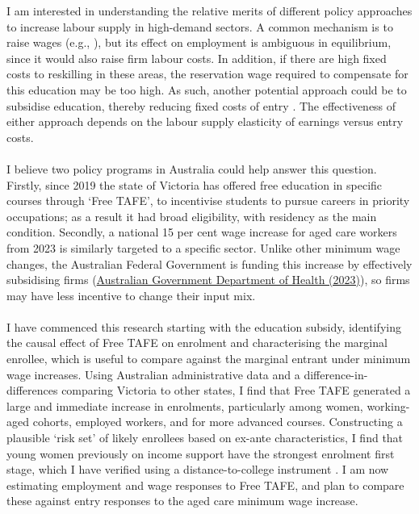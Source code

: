  I am interested in understanding the relative merits of different policy approaches to increase labour supply in high-demand sectors. A common mechanism is to raise wages (e.g., \cite{dalbo_finan_rossi2013}), but its effect on employment is ambiguous in equilibrium, since it would also raise firm labour costs. In addition, if there are high fixed costs to reskilling in these areas, the reservation wage required to compensate for this education may be too high. As such, another potential approach could be to subsidise education, thereby reducing fixed costs of entry \citep{schoonover2026}. The effectiveness of either approach depends on the labour supply elasticity of earnings versus entry costs. \\~\\I believe two policy programs in Australia could help answer this question. Firstly, since 2019 the state of Victoria has offered free education in specific courses through `Free TAFE', to incentivise students to pursue careers in priority occupations; as a result it had broad eligibility, with residency as the main condition. Secondly, a national 15 per cent wage increase for aged care workers from 2023 \citep{fwc_agedcare2022} is similarly targeted to a specific sector. Unlike other minimum wage changes, the Australian Federal Government is funding this increase by effectively subsidising firms (\href{https://www.health.gov.au/ministers/the-hon-mark-butler-mp/media/budget-2023-24-delivering-the-largest-ever-pay-rise-to-aged-care-workers?language=en&utm_source=miragenews&utm_medium=miragenews&utm_campaign=news}{Australian Government Department of Health (2023)}), so firms may have less incentive to change their input mix. \\~\\I have commenced this research starting with the education subsidy, identifying the causal effect of Free TAFE on enrolment and characterising the marginal enrollee, which is useful to compare against the marginal entrant under minimum wage increases. Using Australian administrative data and a difference-in-differences comparing Victoria to other states, I find that Free TAFE generated a large and immediate increase in enrolments, particularly among women, working-aged cohorts, employed workers, and for more advanced courses. Constructing a plausible `risk set' of likely enrollees based on ex-ante characteristics, I find that young women previously on income support have the strongest enrolment first stage, which I have verified using a distance-to-college instrument \citep{card1995}. I am now estimating employment and wage responses to Free TAFE, and plan to compare these against entry responses to the aged care minimum wage increase.

